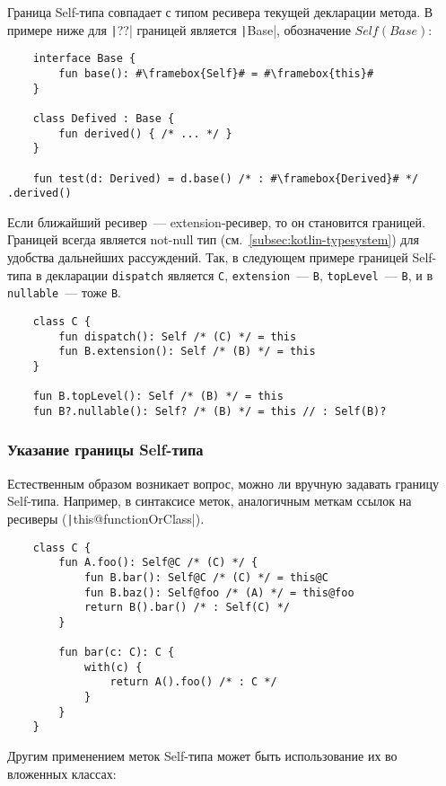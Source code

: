 Граница Self-типа совпадает с типом ресивера текущей декларации метода.
В примере ниже для \texttt|??| границей является \texttt|Base|, обозначение $Self(Base)$:

\begin{verbatim}
    interface Base {
        fun base(): #\framebox{Self}# = #\framebox{this}#
    }

    class Defived : Base {
        fun derived() { /* ... */ }
    }

    fun test(d: Derived) = d.base() /* : #\framebox{Derived}# */ .derived()
\end{verbatim}

Если ближайший ресивер~--- extension-ресивер, то он становится границей.
Границей всегда является not-null тип (см.~\ref{subsec:kotlin-typesystem}) для удобства дальнейших рассуждений.
Так, в следующем примере границей Self-типа в декларации \texttt{dispatch} является \texttt{C}, \texttt{extension}~--- \texttt{B}, \texttt{topLevel}~--- \texttt{B}, и в \texttt{nullable}~--- тоже \texttt{B}.

\begin{verbatim}
    class C {
        fun dispatch(): Self /* (C) */ = this
        fun B.extension(): Self /* (B) */ = this
    }

    fun B.topLevel(): Self /* (B) */ = this
    fun B?.nullable(): Self? /* (B) */ = this // : Self(B)?
\end{verbatim}

\subsubsection{Указание границы Self-типа}

Естественным образом возникает вопрос, можно ли вручную задавать границу Self-типа.
Например, в синтаксисе меток, аналогичным меткам ссылок на ресиверы (\texttt|this@functionOrClass|).

\begin{verbatim}
    class C {
        fun A.foo(): Self@C /* (C) */ {
            fun B.bar(): Self@C /* (C) */ = this@C
            fun B.baz(): Self@foo /* (A) */ = this@foo
            return B().bar() /* : Self(C) */
        }

        fun bar(c: C): С {
            with(c) {
                return A().foo() /* : C */
            }
        }
    }
\end{verbatim}

Другим применением меток Self-типа может быть использование их во вложенных классах:

